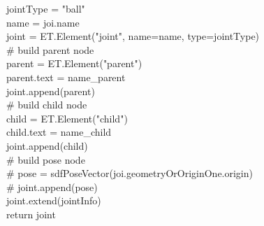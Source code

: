 {\hphantom{\quad\quad}jointType = "ball"\\
\hphantom{\quad}name = joi.name\\
\hphantom{\quad}joint = ET.Element("joint", name=name, type=jointType)\\
\hphantom{\quad}\# build parent node\\
\hphantom{\quad}parent = ET.Element("parent")\\
\hphantom{\quad}parent.text = name\_parent\\
\hphantom{\quad}joint.append(parent)\\
\hphantom{\quad}\# build child node\\
\hphantom{\quad}child = ET.Element("child")\\
\hphantom{\quad}child.text = name\_child\\
\hphantom{\quad}joint.append(child)\\
\hphantom{\quad}\# build pose node\\
\hphantom{\quad}\#  pose = sdfPoseVector(joi.geometryOrOriginOne.origin)\\
\hphantom{\quad}\#  joint.append(pose)\\
\hphantom{\quad}joint.extend(jointInfo)\\
\hphantom{\quad}return joint}
